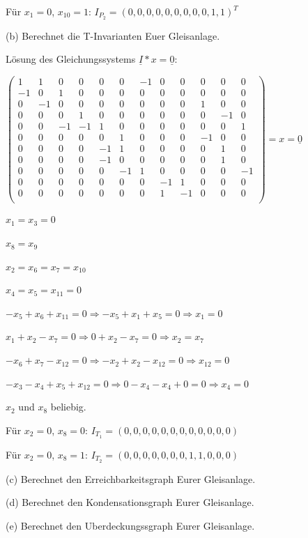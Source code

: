 \documentclass{scrreprt}
\begin{document}
\begin{enumerate}
\begin{enumerate}
Für \(x_1=0\), \(x_{10}=1\): \(I_{P_2} = (0, 0, 0, 0, 0, 0, 0, 0, 0, 1, 1)^T\)

\end{enumerate}

(b) Berechnet die T-Invarianten Euer Gleisanlage.

Lösung des Gleichungssystems \( \underline{I} * x = \underline{0} \):

\( \begin{pmatrix}
 1 & 1 & 0 & 0 & 0 & 0 &-1 & 0 & 0 & 0 & 0 & 0 \\
-1 & 0 & 1 & 0 & 0 & 0 & 0 & 0 & 0 & 0 & 0 & 0 \\
 0 &-1 & 0 & 0 & 0 & 0 & 0 & 0 & 0 & 1 & 0 & 0 \\
 0 & 0 & 0 & 1 & 0 & 0 & 0 & 0 & 0 & 0 &-1 & 0 \\
 0 & 0 &-1 &-1 & 1 & 0 & 0 & 0 & 0 & 0 & 0 & 1 \\
 0 & 0 & 0 & 0 & 0 & 1 & 0 & 0 & 0 &-1 & 0 & 0 \\
 0 & 0 & 0 & 0 &-1 & 1 & 0 & 0 & 0 & 0 & 1 & 0 \\
 0 & 0 & 0 & 0 &-1 & 0 & 0 & 0 & 0 & 0 & 1 & 0 \\
 0 & 0 & 0 & 0 & 0 &-1 & 1 & 0 & 0 & 0 & 0 &-1 \\
 0 & 0 & 0 & 0 & 0 & 0 & 0 &-1 & 1 & 0 & 0 & 0 \\
 0 & 0 & 0 & 0 & 0 & 0 & 0 & 1 &-1 & 0 & 0 & 0 \\
\end{pmatrix} = x = \underline{0} \)

\( x_1 = x_3 = 0 \)

\( x_8 = x_9 \)

\( x_2 = x_6 = x_7 = x_{10} \)

\( x_4 = x_5 = x_{11} = 0\)

\( -x_5 + x_6 + x_{11} = 0 \Rightarrow -x_5 + x_1 + x_5 = 0 \Rightarrow x_1 = 0 \)

\( x_1 + x_2 - x_7 = 0 \Rightarrow 0 + x_2 - x_7 = 0 \Rightarrow x_2 = x_7 \)

\( -x_6 + x_7 - x_{12} = 0 \Rightarrow -x_2 + x_2 - x_{12} = 0 \Rightarrow x_{12} = 0 \)

\( -x_3 - x_4 + x_5 + x_{12} = 0 \Rightarrow 0 - x_4 - x_4 + 0 = 0 \Rightarrow x_4 = 0 \)

\(x_2\) und \(x_8\) beliebig.

Für \(x_2=0\), \(x_8=0\): \(I_{T_1}=(0, 0, 0, 0, 0, 0, 0, 0, 0, 0, 0, 0)\)

Für \(x_2=0\), \(x_8=1\): \(I_{T_2}=(0, 0, 0, 0, 0, 0, 0, 1, 1, 0, 0, 0)\)

(c) Berechnet den Erreichbarkeitsgraph Eurer Gleisanlage.

(d) Berechnet den Kondensationsgraph Eurer Gleisanlage.

(e) Berechnet den Uberdeckungssgraph Eurer Gleisanlage.


\end{enumerate}
\end{document}
